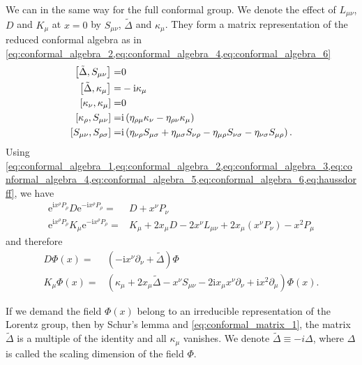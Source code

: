 \documentclass[10pt]{article}
\newcommand{\me}{\mathrm{e}}
\newcommand{\ii}{\mathrm{i}}
\begin{document}
We can in the same way for the full conformal group.
We denote the effect of $L_{\mu\nu}$, $D$ and $K_\mu$ at $x=0$ by $S_{\mu\nu}$, $\tilde{\Delta}$ and $\kappa_\mu$.
They form a matrix representation of the reduced conformal algebra as in \cref{eq:conformal_algebra_2,eq:conformal_algebra_4,eq:conformal_algebra_6}
\begin{subequations}
    \begin{align}
        \comm{\tilde{\Delta}}{S_{\mu\nu}}=&0\label{eq:conformal_matrix_1}\\
        \comm{\tilde{\Delta}}{\kappa_\mu}=&-\ii\kappa_\mu\\
        \comm{\kappa_\nu}{\kappa_\mu}=&0\\
        \comm{\kappa_\rho}{S_{\mu\nu}}=&\ii\left(\eta_{\rho\mu}\kappa_{\nu}-\eta_{\rho\nu}\kappa_\mu\right)\\
        \comm{S_{\mu\nu}}{S_{\rho\sigma}}=&\ii\left(\eta_{\nu\rho}S_{\mu\sigma}+\eta_{\mu\sigma}S_{\nu\rho}-\eta_{\mu\rho}S_{\nu\sigma}-\eta_{\nu\sigma}S_{\mu\rho}\right).
    \end{align}
\end{subequations}
Using \cref{eq:conformal_algebra_1,eq:conformal_algebra_2,eq:conformal_algebra_3,eq:conformal_algebra_4,eq:conformal_algebra_5,eq:conformal_algebra_6,eq:haussdorff}, we have 
\begin{align}
    \me^{\ii x^\rho P_\rho}D\me^{-\ii x^\rho P_\rho}=&D+x^\nu P_\nu\\
    \me^{\ii x^\rho P_\rho}K_\mu\me^{-\ii x^\rho P_\rho}=&K_\mu+2x_\mu D-2x^\nu L_{\mu\nu}+2x_\mu\left(x^\nu P_\nu\right)-x^2 P_\mu
\end{align}
and therefore
\begin{align}
    D\Phi(x)=&\left(-\ii x^\nu\partial_\nu+\tilde{\Delta}\right)\Phi\\
    K_\mu\Phi(x)=&\left(\kappa_\mu+2x_\mu\tilde{\Delta}-x^\nu S_{\mu\nu}-2\ii x_\mu x^\nu\partial_\nu+\ii x^2 \partial_\mu\right)\Phi(x).
\end{align}

\begin{remark}
    If we demand the field $\Phi(x)$ belong to an irreducible representation of the Lorentz group, then by Schur's lemma and \cref{eq:conformal_matrix_1}, the matrix $\tilde{\Delta}$ is a multiple of the identity and all $\kappa_\mu$ vanishes.
    We denote $\tilde{\Delta}\equiv-i\Delta$, where $\Delta$ is called the scaling dimension of the field $\Phi$.
\end{remark}
\end{document}
